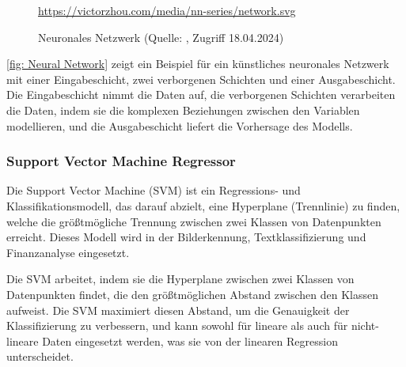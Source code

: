 \begin{figure}[H]
    \centering
    \urldef{\myurl}\url{https://victorzhou.com/media/nn-series/network.svg}
    \caption[Neuronales Netzwerk]{Neuronales Netzwerk (Quelle: \protect\myurl{}, Zugriff 18.04.2024)}
    \label{fig: Neural Network}
\end{figure}

\autoref{fig: Neural Network} zeigt ein Beispiel für ein künstliches neuronales Netzwerk mit einer Eingabeschicht, zwei verborgenen Schichten und einer Ausgabeschicht. Die Eingabeschicht nimmt die Daten auf, die verborgenen Schichten verarbeiten die Daten, indem sie die komplexen Beziehungen zwischen den Variablen modellieren, und die Ausgabeschicht liefert die Vorhersage des Modells.

\subsubsection{Support Vector Machine Regressor}\label{sec: Support Vector Machine Regressor}
Die Support Vector Machine (SVM) ist ein Regressions- und Klassifikationsmodell, das darauf abzielt, eine Hyperplane (Trennlinie) zu finden, welche die größtmögliche Trennung zwischen zwei Klassen von Datenpunkten erreicht. Dieses Modell wird in der Bilderkennung, Textklassifizierung und Finanzanalyse eingesetzt.

Die SVM arbeitet, indem sie die Hyperplane zwischen zwei Klassen von Datenpunkten findet, die den größtmöglichen Abstand zwischen den Klassen aufweist. Die SVM maximiert diesen Abstand, um die Genauigkeit der Klassifizierung zu verbessern, und kann sowohl für lineare als auch für nicht-lineare Daten eingesetzt werden, was sie von der linearen Regression unterscheidet.

